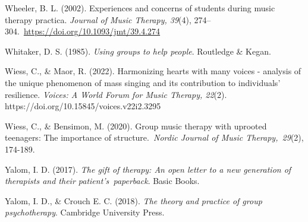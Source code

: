 \documentclass[authordate, empirical, issue]{jote-new-article}
\begin{document}
Wheeler, B. L. (2002). Experiences and concerns of students during music therapy practica. \emph{Journal of Music Therapy, 39}(4), 274--304. \href{https://doi.org/10.1093/jmt/39.4.274}{https://doi.org/10.1093/jmt/39.4.274}



Whitaker, D. S. (1985). \emph{Using groups to help people}. Routledge \& Kegan.



Wiess, C., \& Maor, R. (2022). Harmonizing hearts with many voices - analysis of the unique phenomenon of mass singing and its contribution to individuals' resilience. \emph{Voices: A World Forum for Music Therapy, 22}(2). https://doi.org/10.15845/voices.v22i2.3295



Wiess, C., \& Bensimon, M. (2020). Group music therapy with uprooted teenagers: The importance of structure. \emph{Nordic Journal of Music Therapy, 29}(2), 174-189.



Yalom, I. D. (2017). \emph{The gift of therapy: An open letter to a new generation of therapists and their patient's paperback}. Basic Books.



Yalom, I. D., \& Crouch E. C. (2018). \emph{The theory and practice of group psychotherapy}. Cambridge University Press.
\end{document}
